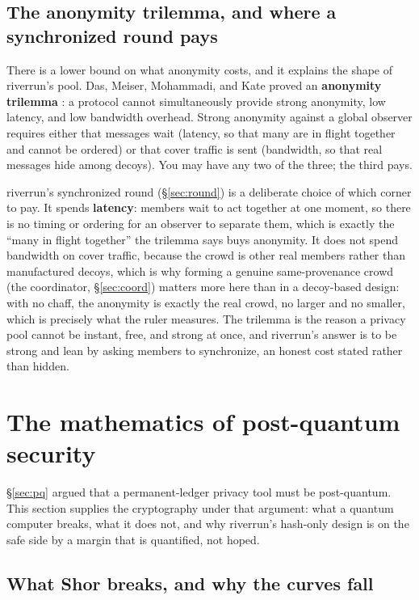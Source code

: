 \documentclass[11pt]{article}
\begin{document}
\subsection{The anonymity trilemma, and where a synchronized round pays}

There is a lower bound on what anonymity costs, and it explains the shape of riverrun's
pool. Das, Meiser, Mohammadi, and Kate proved an \textbf{anonymity trilemma}
\cite{trilemma}: a protocol cannot simultaneously provide strong anonymity, low latency,
and low bandwidth overhead. Strong anonymity against a global observer requires either
that messages wait (latency, so that many are in flight together and cannot be ordered) or
that cover traffic is sent (bandwidth, so that real messages hide among decoys). You may
have any two of the three; the third pays.

riverrun's synchronized round (\S\ref{sec:round}) is a deliberate choice of which corner to
pay. It spends \textbf{latency}: members wait to act together at one moment, so there is no
timing or ordering for an observer to separate them, which is exactly the ``many in flight
together'' the trilemma says buys anonymity. It does not spend bandwidth on cover traffic,
because the crowd is other real members rather than manufactured decoys, which is why
forming a genuine same-provenance crowd (the coordinator, \S\ref{sec:coord}) matters more
here than in a decoy-based design: with no chaff, the anonymity is exactly the real crowd,
no larger and no smaller, which is precisely what the ruler measures. The trilemma is the
reason a privacy pool cannot be instant, free, and strong at once, and riverrun's answer is
to be strong and lean by asking members to synchronize, an honest cost stated rather than
hidden.

\section{The mathematics of post-quantum security}
\label{sec:math-pq}

\S\ref{sec:pq} argued that a permanent-ledger privacy tool must be post-quantum. This
section supplies the cryptography under that argument: what a quantum computer breaks,
what it does not, and why riverrun's hash-only design is on the safe side by a margin
that is quantified, not hoped.

\subsection{What Shor breaks, and why the curves fall}
\end{document}
